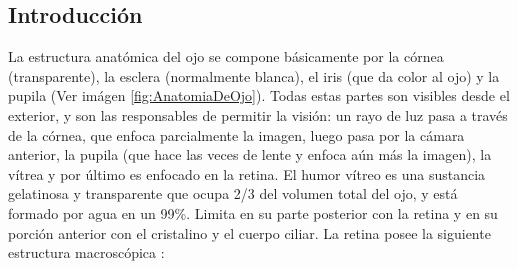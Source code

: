\subsection{Introducci\'on}

La estructura anatómica del ojo se compone básicamente por la córnea (transparente), la esclera (normalmente blanca), el iris (que da color al ojo) y la pupila (Ver im\'agen \ref{fig:AnatomiaDeOjo}). Todas estas partes son visibles desde el exterior, y son las responsables de permitir la visión: un rayo de luz pasa a través de la córnea, que enfoca parcialmente la imagen, luego pasa por la cámara anterior, la pupila (que hace las veces de lente y enfoca aún más la imagen), la vítrea y por último es enfocado en la retina. El humor v\'itreo es una sustancia gelatinosa y transparente que ocupa 2/3 del volumen total del ojo, y est\'a formado por agua en un 99\%. Limita en su parte posterior con la retina y en su porci\'on anterior con el cristalino y el cuerpo ciliar. 
La retina posee la siguiente estructura macrosc\'opica \cite{patton2006retinal}:
